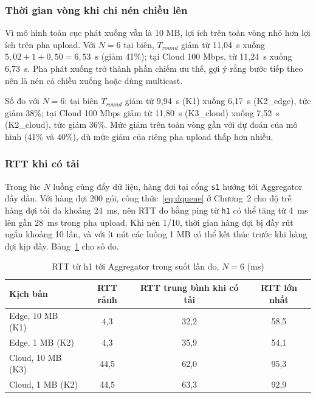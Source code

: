\subsubsection{Thời gian vòng khi chỉ nén chiều lên}
Vì mô hình toàn cục phát xuống vẫn là 10 MB, lợi ích trên toàn vòng nhỏ hơn lợi ích trên pha upload. Với $N = 6$ tại biên, $T_{round}$ giảm từ 11{,}04~s xuống $5{,}02 + 1 + 0{,}50 = 6{,}53$~s (giảm 41\%); tại Cloud 100 Mbps, từ 11{,}24~s xuống 6{,}73~s. Pha phát xuống trở thành phần chiếm ưu thế, gợi ý rằng bước tiếp theo nên là nén cả chiều xuống hoặc dùng multicast.

Số đo với $N = 6$: tại biên $T_{round}$ giảm từ 9{,}94~s (K1) xuống 6{,}17~s (K2\_edge), tức giảm 38\%; tại Cloud 100 Mbps giảm từ 11{,}80~s (K3\_cloud) xuống 7{,}52~s (K2\_cloud), tức giảm 36\%. Mức giảm trên toàn vòng gần với dự đoán của mô hình (41\% và 40\%), dù mức giảm của riêng pha upload thấp hơn nhiều.

\subsubsection{RTT khi có tải}
Trong lúc $N$ luồng cùng đẩy dữ liệu, hàng đợi tại cổng \texttt{s1} hướng tới Aggregator đầy dần. Với hàng đợi 200 gói, công thức~\eqref{eq:dqueue} ở Chương~2 cho độ trễ hàng đợi tối đa khoảng 24~ms, nên RTT đo bằng ping từ \texttt{h1} có thể tăng từ 4~ms lên gần 28~ms trong pha upload. Khi nén 1/10, thời gian hàng đợi bị đầy rút ngắn khoảng 10 lần, và với ít nút các luồng 1 MB có thể kết thúc trước khi hàng đợi kịp đầy. Bảng~\ref{tab:q2rtt} cho số đo.

\begin{table}[H]
    \centering
    \caption{RTT từ h1 tới Aggregator trong suốt lần đo, $N = 6$ (ms)}
    \label{tab:q2rtt}
    \begin{tabular}{l c c c}
        \toprule
        \textbf{Kịch bản} & \textbf{RTT rảnh} & \textbf{RTT trung bình khi có tải} & \textbf{RTT lớn nhất} \\
        \midrule
        Edge, 10 MB (K1) & 4,3 & 32,2 & 58,5 \\
        Edge, 1 MB (K2) & 4,3 & 35,9 & 54,1 \\
        Cloud, 10 MB (K3) & 44,5 & 62,0 & 95,3 \\
        Cloud, 1 MB (K2) & 44,5 & 63,3 & 92,9 \\
        \bottomrule
    \end{tabular}
\end{table}

